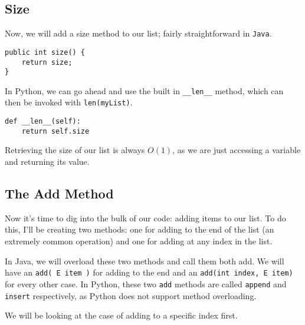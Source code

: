 %
%
%

\subsection{Size}
Now, we will add a size method to our list; fairly straightforward in \texttt{Java}.

\begin{verbatim}
public int size() {  
	return size;
}
\end{verbatim}

In Python, we can go ahead and use the built in \texttt{\_\_len\_\_} method, which can then be invoked with \texttt{len(myList)}.

\begin{verbatim}
def __len__(self):
	return self.size
\end{verbatim}




Retrieving the size of our list is always $O(1)$, as we are just accessing a variable and returning its value.

\subsection{The Add Method}
Now it's time to dig into the bulk of our code: adding items to our list.
To do this, I'll be creating two methods:  one for adding to the end of the list (an extremely common operation) and one for adding at any index in the list.

In Java, we will overload these two methods and call them both add.  We will have an \texttt{add( E item )} for adding to the end and an \texttt{add(int index, E item)} for every other case.  
In Python, these two \texttt{add} methods are called \texttt{append} and \texttt{insert} respectively, as Python does not support method overloading.

We will be looking at the case of adding to a specific index first.


